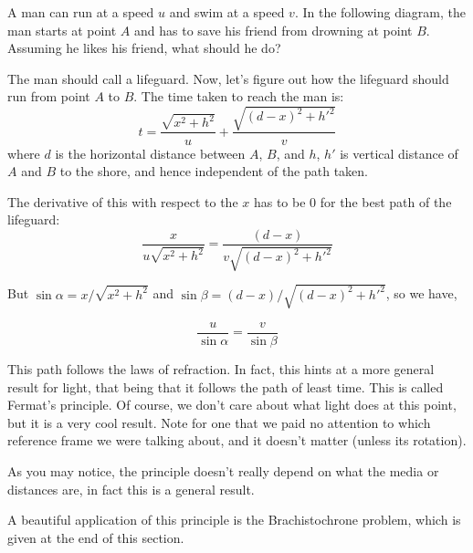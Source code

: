     \begin{example}
        A man can run at a speed $u$ and swim at a speed $v$. In the following diagram, 
        the man starts at point $A$ and has to save his friend from drowning at point $B$. 
        Assuming he likes his friend, what should he do? 

        \begin{soln}
            The man should call a lifeguard. Now, let's figure out how the lifeguard should run from point $A$ to $B$.
            The time taken to reach the man is: 
            \[
                t = \frac{\sqrt{x^2 + h^2}}{u} + \frac{\sqrt{(d-x)^2 + h'^2}}{v}
            \]
            where $d$ is the horizontal distance between $A$, $B$, and $h$, $h'$ is vertical 
            distance of $A$ and $B$ to the shore, and hence independent of the path taken.

            The derivative of this with respect to the $x$ has to be $0$ for the best path of the lifeguard:
            \[
                \frac{x}{u\sqrt{x^2 + h^2}} = \frac{(d-x)}{v\sqrt{(d-x)^2 + h'^2}}
            \]

            But $\sin\alpha = x/\sqrt{x^2 + h^2}$ and $\sin\beta = (d-x)/\sqrt{(d-x)^2 + h'^2}$, so we have,
            
            \begin{equation}
            \boxed{\frac{u}{\sin\alpha} = \frac{v}{\sin\beta}}
            \end{equation}
        \end{soln}
    \end{example}

    This path follows the laws of refraction. In fact, this hints at a more general result for light, 
    that being that it follows the path of least time. This is called Fermat's principle.
     Of course, we don't care about what light does at this point, but it is a very cool 
     result. Note for one that we paid no attention to which reference frame we were talking about, and it 
     doesn't matter (unless its rotation).

    As you may notice, the principle doesn't really depend on what the media or distances are,
    in fact this is a general result.  

    A beautiful application of this principle is the Brachistochrone problem, which is given at the end of this section. 

